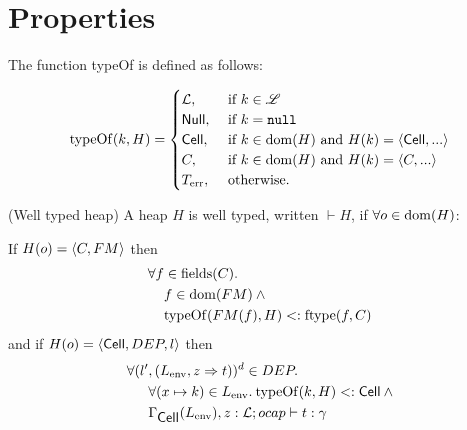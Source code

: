 \section{Properties}
\label{sec:properties}

\begin{definition}
  The function typeOf is defined as follows:

  \begin{equation}
    \mbox{$\mathrm{typeOf}$}{(k, H)} =
    \begin{cases}
      \mbox{$\mathcal{L}$}, &\text{ if }k \in \mbox{$\mathscr{L}$} \\
      \mbox{$\mathsf{Null}$}, &\text{ if }k = \mbox{\texttt{null}} \\
      \mbox{$\mathsf{Cell}$}, &\text{ if }k \in \mbox{$\mathrm{dom}$}{(H)}\text{ and } H(k) = \mbox{$\langle \mbox{$\mathsf{Cell}$}{}, ... \rangle$} \\
      C, &\text{ if }k \in \mbox{$\mathrm{dom}$}{(H)}\text{ and } H(k) = \mbox{$\langle C, ... \rangle$} \\
      \mbox{$T_{\text{err}}$}, &\text{ otherwise.}
    \end{cases}
  \end{equation}
\end{definition}


\begin{definition}{(Well typed heap)}
  A heap $H$ is well typed, written $\vdash{H}$, if
  $\forall o \in \mbox{$\mathrm{dom}$}{(H)}$:

  If $H(o) = \mbox{$\langle C, FM \rangle$}$ then
  \begin{equation} \label{eq:defwth1}
    \begin{aligned}
      \forall f &\in \mbox{$\mathrm{fields}$}{(C)}. \notag\\ 
      &f \in \mbox{$\mathrm{dom}$}{(FM)} \: \land \notag\\ &\mbox{$\mathrm{typeOf}$}{(FM(f), H)} <: \mbox{$\mathrm{ftype}$}{(f, C)}
    \end{aligned}
  \end{equation}
  and if $H(o) = \mbox{$\langle \mbox{$\mathsf{Cell}$}{}, DEP, l \rangle$}$ then
  \begin{equation} \label{eq:defwth2}
    \begin{aligned}
      \forall (l'&, (L_{\text{env}}, z \Rightarrow t))^d \in DEP. \notag\\
      &\forall (x \mapsto k) \in L_{\text{env}}.\: \mbox{$\mathrm{typeOf}$}{(k, H)} <:
      \mbox{$\mathsf{Cell}$} \: \land \notag\\
      &\mbox{$\Gamma_{\mbox{$\mathsf{Cell}$}{}}(L_{\text{env}}), z:
      \mbox{$\mathcal{L}$};\mbox{$ocap$}\vdash t:\gamma$} 
    \end{aligned}
  \end{equation}
\end{definition}


